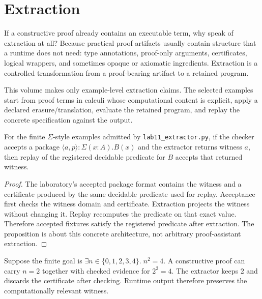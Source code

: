 \chapter{Extraction}
\label{ch:extraction}

If a constructive proof already contains an executable term, why speak of extraction at all? Because practical proof artifacts usually contain structure that a runtime does not need: type annotations, proof-only arguments, certificates, logical wrappers, and sometimes opaque or axiomatic ingredients. Extraction is a controlled transformation from a proof-bearing artifact to a retained program.



This volume makes only example-level extraction claims. The selected examples start from proof terms in calculi whose computational content is explicit, apply a declared erasure/translation, evaluate the retained program, and replay the concrete specification against the output.

\begin{proposition}
For the finite $\Sigma$-style examples admitted by \texttt{lab11\_extractor.py}, if the checker accepts a package $\langle a,p\rangle:\Sigma(x:A).B(x)$ and the extractor returns witness $a$, then replay of the registered decidable predicate for $B$ accepts that returned witness.
\end{proposition}
\begin{proof}
The laboratory's accepted package format contains the witness and a certificate produced by the same decidable predicate used for replay. Acceptance first checks the witness domain and certificate. Extraction projects the witness without changing it. Replay recomputes the predicate on that exact value. Therefore accepted fixtures satisfy the registered predicate after extraction. The proposition is about this concrete architecture, not arbitrary proof-assistant extraction.
\end{proof}



\begin{workedexample}[title={A proof that returns the witness}]
Suppose the finite goal is $\exists n\in\{0,1,2,3,4\}.\;n^2=4$. A constructive proof can carry $n=2$ together with checked evidence for $2^2=4$. The extractor keeps $2$ and discards the certificate after checking. Runtime output therefore preserves the computationally relevant witness.
\end{workedexample}

